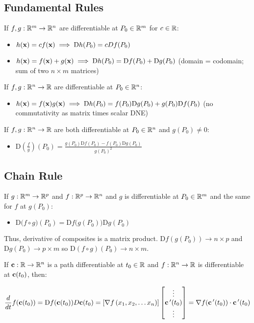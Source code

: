 \subsection{Fundamental Rules}

If $f,g:\mathbb{R}^m\to \mathbb{R}^n$ are differentiable at $P_0\in \mathbb{R}^m$ for $c\in \mathbb{R}$:
\begin{itemize}
    \item $h(\textbf{x})=cf(\textbf{x})\implies \mathrm{D}h(P_0)=cDf(P_0)$
    \item $h(\textbf{x})=f(\textbf{x})+g(\textbf{x})\implies \mathrm{D}h(P_0)=\mathrm{D}f(P_0)+\mathrm{D}g(P_0)$ (domain = codomain; sum of two $n\times m$ matrices)
\end{itemize}

If $f,g:\mathbb{R}^n\to \mathbb{R}$ are differentiable at $P_0\in \mathbb{R}^n$:
\begin{itemize}
    \item $h(\textbf{x})=f(\textbf{x})g(\textbf{x})\implies \mathrm{D}h(P_0)=f(P_0)\mathrm{D}g(P_0)+g(P_0)\mathrm{D}f(P_0)$ (no commutativity as matrix times scalar DNE)
\end{itemize}

If $f,g:\mathbb{R}^n\to \mathbb{R}$ are both differentiable at $P_0\in \mathbb{R}^n$ and $g(P_0)\neq 0$:
\begin{itemize}
    \item $\mathrm{D}\left(\frac{f}{g}\right)(P_0)=\frac{g(P_0)\mathrm{D}f(P_0)-f(P_0)\mathrm{D}g(P_0)}{g(P_0)^2}$
\end{itemize}

\subsection{Chain Rule}

If $g:\mathbb{R}^m\to \mathbb{R}^p$ and $f:\mathbb{R}^p\to \mathbb{R}^n$ and $g$ is differentiable at $P_0\in \mathbb{R}^m$ and the same for $f$ at $g(P_0)$:
\begin{itemize}
    \item $\mathrm{D}\Big(f\circ g\Big)(P_0)=\mathrm{D}f\big(g(P_0)\big)\mathrm{D}g(P_0)$
\end{itemize}

Thus, derivative of composites is a matrix product. $\mathrm{D}f(g(P_0))\to n\times p$ and $\mathrm{D}g(P_0)\to p\times m$
so $\mathrm{D}(f\circ g)(P_0)\to n\times m$.

If $\textbf{c}:\mathbb{R}\to \mathbb{R}^n$ is a path differentiable at $t_0\in \mathbb{R}$ and $f:\mathbb{R}^n\to \mathbb{R}$ is differentiable at $\textbf{c}(t_0)$, then:

\[\frac{d}{dt}f(\textbf{c}(t_0))=\mathrm{D}f(\textbf{c}(t_0))D\textbf{c}(t_0)=\left[ \nabla f\left( x_{1},x_{2},\ldots x_{n}\right) \right]\begin{bmatrix} \vdots \\ \textbf{c}\,'(t_0) \\ \vdots \end{bmatrix}=\nabla f(\textbf{c}\,'(t_0))\cdot \textbf{c}\,'(t_0)\]

